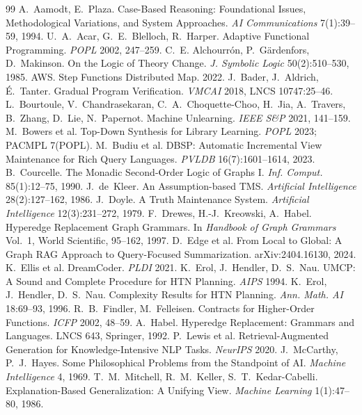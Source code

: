 \documentclass[11pt]{article}
\begin{document}
\begin{thebibliography}{99}
 A.~Aamodt, E.~Plaza. Case-Based Reasoning: Foundational Issues, Methodological Variations, and System Approaches. \emph{AI Communications} 7(1):39--59, 1994.
 U.~A.~Acar, G.~E.~Blelloch, R.~Harper. Adaptive Functional Programming. \emph{POPL} 2002, 247--259.
 C.~E. Alchourr\'on, P.~G\"ardenfors, D.~Makinson. On the Logic of Theory Change. \emph{J. Symbolic Logic} 50(2):510--530, 1985.
 AWS. Step Functions Distributed Map. 2022.
 J.~Bader, J.~Aldrich, \'E.~Tanter. Gradual Program Verification. \emph{VMCAI} 2018, LNCS 10747:25--46.
 L.~Bourtoule, V.~Chandrasekaran, C.~A.~Choquette-Choo, H.~Jia, A.~Travers, B.~Zhang, D.~Lie, N.~Papernot. Machine Unlearning. \emph{IEEE S\&P} 2021, 141--159.
 M.~Bowers et al. Top-Down Synthesis for Library Learning. \emph{POPL} 2023; PACMPL 7(POPL).
 M.~Budiu et al. DBSP: Automatic Incremental View Maintenance for Rich Query Languages. \emph{PVLDB} 16(7):1601--1614, 2023.
 B.~Courcelle. The Monadic Second-Order Logic of Graphs I. \emph{Inf. Comput.} 85(1):12--75, 1990.
 J.~de~Kleer. An Assumption-based TMS. \emph{Artificial Intelligence} 28(2):127--162, 1986.
 J.~Doyle. A Truth Maintenance System. \emph{Artificial Intelligence} 12(3):231--272, 1979.
 F.~Drewes, H.-J.~Kreowski, A.~Habel. Hyperedge Replacement Graph Grammars. In \emph{Handbook of Graph Grammars} Vol.~1, World Scientific, 95--162, 1997.
 D.~Edge et al. From Local to Global: A Graph RAG Approach to Query-Focused Summarization. arXiv:2404.16130, 2024.
 K.~Ellis et al. DreamCoder. \emph{PLDI} 2021.
 K.~Erol, J.~Hendler, D.~S.~Nau. UMCP: A Sound and Complete Procedure for HTN Planning. \emph{AIPS} 1994.
 K.~Erol, J.~Hendler, D.~S.~Nau. Complexity Results for HTN Planning. \emph{Ann. Math. AI} 18:69--93, 1996.
 R.~B.~Findler, M.~Felleisen. Contracts for Higher-Order Functions. \emph{ICFP} 2002, 48--59.
 A.~Habel. Hyperedge Replacement: Grammars and Languages. LNCS 643, Springer, 1992.
 P.~Lewis et al. Retrieval-Augmented Generation for Knowledge-Intensive NLP Tasks. \emph{NeurIPS} 2020.
 J.~McCarthy, P.~J.~Hayes. Some Philosophical Problems from the Standpoint of AI. \emph{Machine Intelligence} 4, 1969.
 T.~M.~Mitchell, R.~M.~Keller, S.~T.~Kedar-Cabelli. Explanation-Based Generalization: A Unifying View. \emph{Machine Learning} 1(1):47--80, 1986.

\end{thebibliography}
\end{document}
